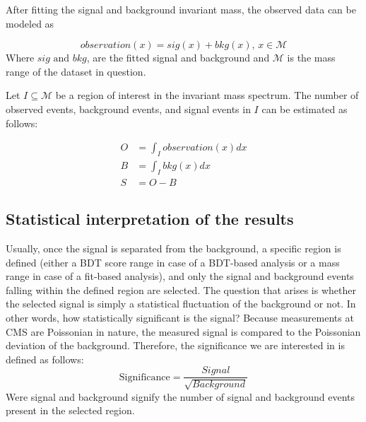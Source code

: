 After fitting the signal and background invariant mass, the observed data can be modeled as

\begin{equation}
observation(x) = sig(x) + bkg(x)\text{, }x\in \mathcal{M}
\end{equation}
Where \(sig\text{ and }bkg\), are the fitted signal and background and \(\mathcal{M}\) is the mass range of the dataset in question.

Let \(I\subseteq \mathcal{M}\) be a region of interest in the invariant mass spectrum. The number of observed events, background events, and signal events in \(I\) can be estimated as follows:

\begin{align}
O &= \int_{I} observation(x) dx \\
B &= \int_{I} bkg(x) dx\\
S &= O - B
\end{align}

\subsection{Statistical interpretation of the results}
\label{sec:org1cfc88b}
Usually, once the signal is separated from the background, a specific region is defined (either a BDT score range in case of a BDT-based analysis or a mass range in case of a fit-based analysis), and only the signal and background events falling within the defined region are selected. The question that arises is whether the selected signal is simply a statistical fluctuation of the background or not. In other words, how statistically significant is the signal? Because measurements at CMS are Poissonian in nature, the measured signal is compared to the Poissonian deviation of the background. Therefore, the significance we are interested in is defined as follows:
\begin{equation}
\text{Significance} = \frac{Signal}{\sqrt{Background}}
\end{equation}
Were signal and background signify the number of signal and background events present in the selected region.  
